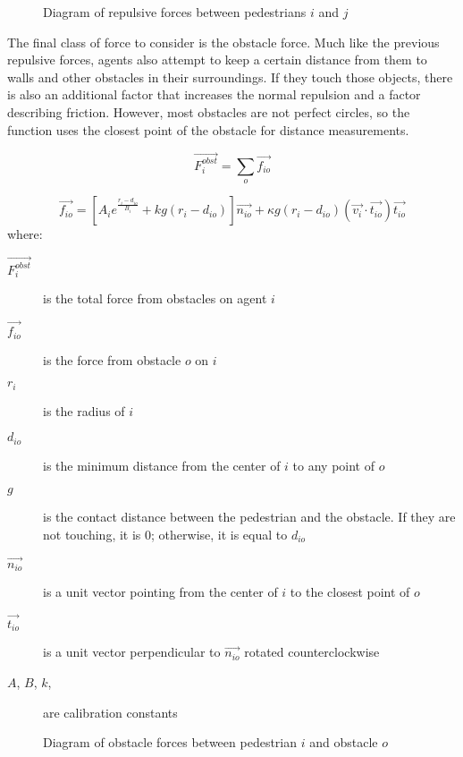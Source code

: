 \documentclass[twoside, 11pt]{article}
\begin{document}
\begin{figure}[h]
  \centering
  
  \caption{Diagram of repulsive forces between pedestrians $i$ and $j$}
  \label{fig:repulsive-forces}
\end{figure}

The final class of force to consider is the obstacle force. Much like the previous repulsive forces, agents also attempt to keep a certain distance from them to walls and other obstacles in their surroundings. If they touch those objects, there is also an additional factor that increases the normal repulsion and a factor describing friction. However, most obstacles are not perfect circles, so the function uses the closest point of the obstacle for distance measurements.

\begin{equation}
  \vec{F_i^{obst}} = \sum_o\vec{f_{io}}
  \label{eq:pedestrian_obstacle_total}
\end{equation}

\begin{equation}
  \vec{f_{io}} = [A_ie^{\frac{r_i - d_{io}}{B_i}} + kg(r_i-d_{io})]\vec{n_{io}} + \kappa g (r_i - d_{io})(\vec{v_i} \cdot \vec{t_{io}})\vec{t_{io}}
  \label{eq:pedestrian_obstacle}
\end{equation}
where:
\begin{description}
  \item[$\vec{F_i^{obst}}$] is the total force from obstacles on agent $i$
  \item[$\vec{f_{io}}$] is the force from obstacle $o$ on $i$
  \item[$r_i$] is the radius of $i$
  \item[$d_{io}$] is the minimum distance from the center of $i$ to any point of $o$
  \item[$g$] is the contact distance between the pedestrian and the obstacle. If they are not touching, it is $0$; otherwise, it is equal to $d_{io}$
  \item[$\vec{n_{io}}$] is a unit vector pointing from the center of $i$ to the closest point of $o$
  \item[$\vec{t_{io}}$] is a unit vector perpendicular to $\vec{n_{io}}$ rotated counterclockwise
  \item[$A$, $B$, $k$, \kappa] are calibration constants
\end{description}

\begin{figure}[h]
  \centering
  
  \caption{Diagram of obstacle forces between pedestrian $i$ and obstacle $o$}
  \label{fig:obstacle-forces}
\end{figure}
\end{document}
